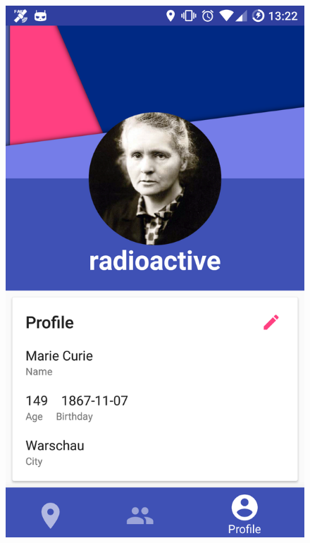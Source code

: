 \documentclass[11pt, accentcolor=tud1c]{tudreport}
\begin{document}
\begin{figure}[h]
\centering
\begin{minipage}{.3\textwidth}
  \centering
  \includegraphics[width=.8\linewidth]{./res/profile.png}
  \label{fig:user_profile}
\end{minipage}%
\begin{minipage}{.3\textwidth}
  \centering

\end{minipage}
\end{figure}
\end{document}
